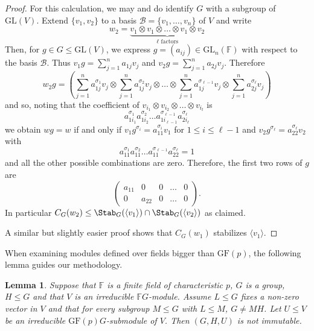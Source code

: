 \documentclass[12pt]{amsart}
\newtheorem{lemma}[theorem]{Lemma}
\theoremstyle{remark}
\theoremstyle{notation}
\theoremstyle{definition}
\newcommand{\GF}{\mathrm{GF}}
\newcommand{\GL}{\mathrm{GL}}
\newcommand{\0}{\emptyset}
\begin{document}
\begin{proof} For this calculation, we may and do identify $G$ with a subgroup of $\GL(V)$.
Extend $\{v_1, v_2 \}$ to a basis $\mathcal B=\{v_1, \dots, v_n\}$ of $V$ and write  $$w_2=\underbrace{v_1\otimes v_1\otimes \dots \otimes v_1\otimes v_2}_{\ell \text{ factors}}$$
Then, for $g\in G\le\GL(V)$, we express $g= (a_{ij})\in \GL_n(\mathbb F)$ with respect to the basis $\mathcal B$. Thus $v_1g= \sum_{j=1}^n a_{1j}v_j$ and $v_2g= \sum_{j=1}^n a_{2j}v_j$.
Therefore $$
w_2g= (\sum_{j=1}^n a_{1j}^{\sigma_1}v_j\otimes \sum_{j=1}^n a_{1j}^{\sigma_2}v_j\otimes \dots \otimes \sum_{j=1}^n a_{1j}^{\sigma_{\ell-1}}v_j\otimes \sum_{j=1}^n a_{2j}^{\sigma_\ell} v_j)$$
and so,   noting that the coefficient of $v_{i_1}\otimes v_{i_2}\otimes \dots \otimes v_{i_l}$  is $$a_{1i_1} ^{\sigma_1}a_{1i_2}^{\sigma_2}\dots a_{1i_{\ell-1}}^{\sigma_{\ell-1}} a_{2i_\ell}^{\sigma_\ell}$$ we obtain
 $wg=w$ if and only if $v_1g^{\sigma _i}=a_{11}^{\sigma _i }v_1$ for $1\le i \le \ell-1$ and  $v_2g^{\sigma_\ell}=
 a_{22}^{\sigma_\ell} v_2$ with
 $$a_{11} ^{\sigma_1}a_{11}^{\sigma_2}\dots a_{11}^{\sigma_{\ell-1}} a_{22}^{\sigma_\ell}=1$$ and all the other possible combinations are zero.
 Therefore,      the first two rows of $g$ are
$$\begin{pmatrix}a_{11}&0&0&\dots&0\\
0&a_{22}&0&\dots&0\end{pmatrix}.$$ In particular $C_G(w_2) \le \Stab_G(\langle v_1\rangle) \cap \Stab_G(\langle v_2\rangle)$ as claimed.

A similar but slightly easier proof shows that  $C_G(w_1)$ stabilizes $\langle v_1\rangle$.
\end{proof}
 





When examining modules defined over fields bigger than $\GF(p)$, the following lemma guides our methodology.

\begin{lemma}\label{lem:good vectors}
Suppose that $\mathbb F$  is a finite field of characteristic $p$, $G$ is a group, $H \le G$  and that $V$ is an irreducible $\mathbb FG$-module. Assume $L \le G$ fixes a non-zero vector in $V$ and that for every subgroup $M\le G$ with $L \le M$,  $G\ne  MH$. Let $U \le V$ be an irreducible $\GF(p)G$-submodule of $V$. Then $(G,H,U)$ is not immutable.
\end{lemma}
\end{document}

